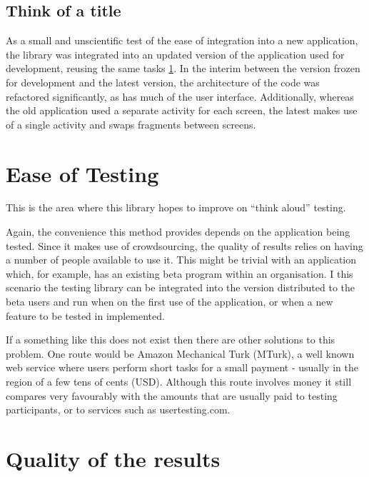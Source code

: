 \subsection{Think of a title}

As a small and unscientific test of the ease of integration into a
new application, the library was integrated into an updated version
of the application used for development, reusing the same tasks
\ref{fig:updated-application}. In the interim between the version
frozen for development and the latest version, the architecture of
the code was refactored significantly, as has much of the user
interface. Additionally, whereas the old application used a separate
activity for each screen, the latest makes use of a single activity
and swaps fragments between screens.


\begin{figure}
  \label{fig:updated-application}
\end{figure}

\section{Ease of Testing}

This is the area where this library hopes to improve on ``think
aloud'' testing.

Again, the convenience this method provides depends on the application
being tested. Since it makes use of crowdsourcing, the quality of
results relies on having a number of people available to use it.
This might be trivial with an application which, for example, has
an existing beta program within an organisation. I this scenario
the testing library can be integrated into the version distributed
to the beta users and run when on the first use of the application,
or when a new feature to be tested in implemented.

If a something like this does not exist then there are other solutions
to this problem. One route would be Amazon Mechanical Turk (MTurk),
a well known web service where users perform short tasks for a small
payment - usually in the region of a few tens of cents (USD).
Although this route involves money it still compares very favourably
with the amounts that are usually paid to testing participants, or
to services such as usertesting.com.

\section{Quality of the results}

